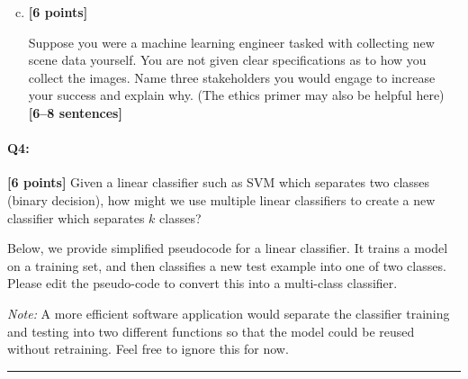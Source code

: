 \begin{enumerate}[(a)]
    \setcounter{enumi}{2}
    \item \textbf{[6 points]}
    \begin{tcolorbox}[colback=orange!5!white,colframe=orange!75!black]
        
    Suppose you were a machine learning engineer tasked with collecting new scene data yourself. You are not given clear specifications as to how you collect the images. Name three stakeholders you would engage to increase your success and explain why. (The ethics primer may also be helpful here) \textbf{[6--8 sentences]}
    \end{tcolorbox}


\end{enumerate}


\pagebreak
\paragraph{Q4:} \textbf{[6 points]} Given a linear classifier such as SVM which separates two classes (binary decision), how might we use multiple linear classifiers to create a new classifier which separates $k$ classes?

\begin{tcolorbox}[colback=orange!5!white,colframe=orange!75!black]
    Below, we provide simplified pseudocode for a linear classifier. It trains a model on a training set, and then classifies a new test example into one of two classes. Please edit the pseudo-code to convert this into a multi-class classifier. 
\end{tcolorbox}

\emph{Note:} A more efficient software application would separate the classifier training and testing into two different functions so that the model could be reused without retraining. Feel free to ignore this for now.

\vspace{2ex}
\hrule
\vspace{1ex}


